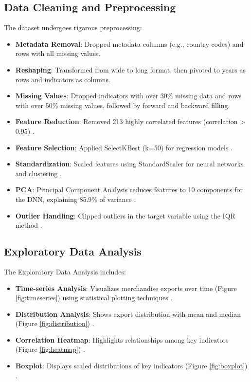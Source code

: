 \documentclass[12pt]{article}
\begin{document}
	\subsection{Data Cleaning and Preprocessing}
	The dataset undergoes rigorous preprocessing:
	\begin{itemize}
		\item \textbf{Metadata Removal}: Dropped metadata columns (e.g., country codes) and rows with all missing values.
		\item \textbf{Reshaping}: Transformed from wide to long format, then pivoted to years as rows and indicators as columns.
		\item \textbf{Missing Values}: Dropped indicators with over 30\% missing data and rows with over 50\% missing values, followed by forward and backward filling.
		\item \textbf{Feature Reduction}: Removed 213 highly correlated features (correlation > 0.95) \citep{hastie2009}.
		\item \textbf{Feature Selection}: Applied SelectKBest (k=50) for regression models \citep{hastie2009}.
		\item \textbf{Standardization}: Scaled features using StandardScaler for neural networks and clustering \citep{hastie2009}.
		\item \textbf{PCA}: Principal Component Analysis reduces features to 10 components for the DNN, explaining 85.9\% of variance \citep{hastie2009}.
		\item \textbf{Outlier Handling}: Clipped outliers in the target variable using the IQR method \citep{hastie2009}.
	\end{itemize}
	
	\subsection{Exploratory Data Analysis}
	The Exploratory Data Analysis includes:
	\begin{itemize}
		\item \textbf{Time-series Analysis}: Visualizes merchandise exports over time (Figure \ref{fig:timeseries}) using statistical plotting techniques \citep{hunter2007}.
		\item \textbf{Distribution Analysis}: Shows export distribution with mean and median (Figure \ref{fig:distribution}) \citep{hunter2007}.
		\item \textbf{Correlation Heatmap}: Highlights relationships among key indicators (Figure \ref{fig:heatmap}) \citep{waskom2021}.
		\item \textbf{Boxplot}: Displays scaled distributions of key indicators (Figure \ref{fig:boxplot}) \citep{waskom2021}.
	\end{itemize}
	
\end{document}
